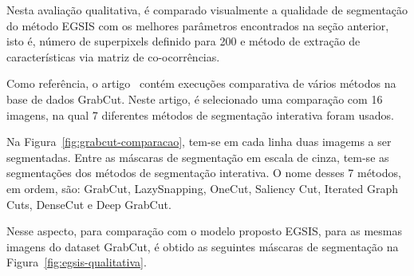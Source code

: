 Nesta avaliação qualitativa, é comparado visualmente a qualidade
de segmentação do método \gls{EGSIS} com os melhores parâmetros
encontrados na seção anterior, isto é, número de superpixels definido
para 200 e método de extração de características via matriz de
co-ocorrências.

Como referência, o artigo~\cite{wang2023review} contém execuções
comparativa de vários métodos na base de dados GrabCut. Neste artigo,
é selecionado uma comparação com 16 imagens, na qual 7 diferentes
métodos de segmentação interativa foram usados.

\begin{figure}[h!]
        \captionsetup{width=16cm}
		\centering
\end{figure}
\FloatBarrier{}

Na Figura~\ref{fig:grabcut-comparacao}, tem-se em cada linha duas
imagems a ser segmentadas. Entre as máscaras de segmentação em escala
de cinza, tem-se as segmentações dos métodos de segmentação
interativa. O nome desses 7 métodos, em ordem, são: GrabCut,
LazySnapping, OneCut, Saliency Cut, Iterated Graph Cuts, DenseCut e
Deep GrabCut.

Nesse aspecto, para comparação com o modelo proposto \gls{EGSIS}, para
as mesmas imagens do dataset GrabCut, é obtido as seguintes máscaras
de segmentação na Figura~\ref{fig:egsis-qualitativa}.

